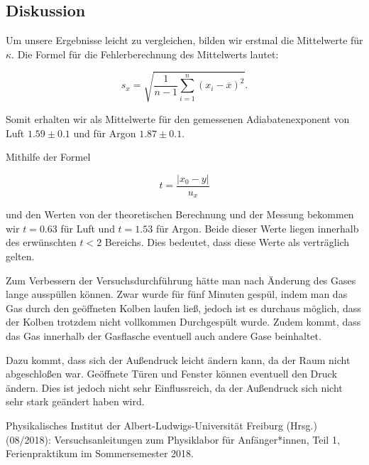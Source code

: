 \documentclass[11pt,a4paper]{article}
\begin{document}
\subsection{Diskussion}

Um unsere Ergebnisse leicht zu vergleichen, bilden wir erstmal die Mittelwerte f\"ur $\kappa$. Die Formel f\"ur die Fehlerberechnung des Mittelwerts lautet:

\begin{equation}
s_x=\sqrt{\frac{1}{n-1}\sum_{i=1}^n(x_i-\overline{x})^2}.\label{uncertainty1}
\end{equation}

Somit erhalten wir als Mittelwerte f\"ur den gemessenen Adiabatenexponent von Luft $1.59\pm0.1$ und f\"ur Argon $1.87\pm0.1$.

Mithilfe der Formel

\begin{equation}
t=\frac{|x_0-y|}{u_x}\label{abw}
\end{equation}

und den Werten von der theoretischen Berechnung und der Messung bekommen wir $t=0.63$ f\"ur Luft und $t=1.53$ f\"ur Argon. Beide dieser Werte liegen innerhalb des erw\"unschten $t<2$ Bereichs. Dies bedeutet, dass diese Werte als vertr\"aglich gelten.

Zum Verbessern der Versuchsdurchf\"uhrung h\"atte man nach \"Anderung des Gases lange aussp\"ullen k\"onnen. Zwar wurde f\"ur f\"unf Minuten gesp\"ul, indem man das Gas durch den ge\"offneten Kolben laufen lie\ss , jedoch ist es durchaus m\"oglich, dass der Kolben trotzdem nicht vollkommen Durchgesp\"ult wurde. Zudem kommt, dass das Gas innerhalb der Gasflasche eventuell auch andere Gase beinhaltet.

Dazu kommt, dass sich der Au\ss endruck leicht \"andern kann, da der Raum nicht abgeschlo\ss en war. Ge\"offnete T\"uren und Fenster k\"onnen eventuell den Druck \"andern. Dies ist jedoch nicht sehr Einflussreich, da der Au\ss endruck sich nicht sehr stark ge\"andert haben wird.

\vfill

\begin{thebibliography}{9}
  Physikalisches Institut der Albert-Ludwigs-Universität Freiburg (Hrsg.) (08/2018): Versuchsanleitungen zum Physiklabor für Anfänger*innen, Teil 1, Ferienpraktikum im Sommersemester 2018.
 \end{thebibliography}
\end{document}
